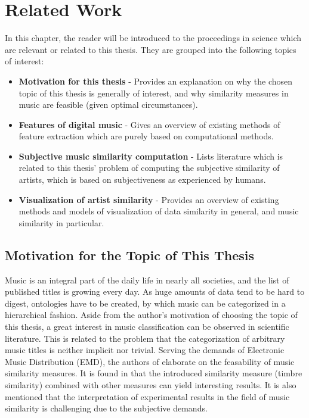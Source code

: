 \section{Related Work}

In this chapter, the reader will be introduced to the proceedings in science which are
relevant or related to this thesis. They are grouped into the following topics of interest:

\begin{itemize}
	\item \textbf {Motivation for this thesis} - Provides an explanation on why the chosen 
		  topic of this thesis is generally of interest, and why similarity measures in music are feasible
		  (given optimal circumstances).
	\item \textbf {Features of digital music} - Gives an overview of existing methods of 
		  feature extraction which are purely based on computational methods.
	\item \textbf {Subjective music similarity computation} - Lists literature which is related
		  to this thesis' problem of computing the subjective similarity of artists, which is
		  based on subjectiveness as experienced by humans.
	\item \textbf {Visualization of artist similarity} - Provides an overview of existing 
		  methods and models of visualization of data similarity in general, and music similarity
		  in particular.
\end{itemize}

\subsection{Motivation for the Topic of This Thesis}

Music is an integral part of the daily life in nearly all societies, and the list of published titles 
is growing every day. As huge amounts of data tend to be hard to digest, ontologies have to be created, 
by which music can be categorized in a hierarchical fashion. Aside from the author's motivation of 
choosing the topic of this thesis, a great interest in music classification can be observed in scientific 
literature. This is related to the problem that the categorization of arbitrary music titles
is neither implicit nor trivial.
Serving the demands of Electronic Music Distribution (EMD), the authors of \cite{pachet:02g} elaborate
on the feasability of music similarity measures. It is found in \cite{pachet:02g} that the introduced
similarity measure (timbre similarity) combined with other measures can yield interesting results. It is
also mentioned that the interpretation of experimental results in the field of music similarity is challenging
due to the subjective demands. 

